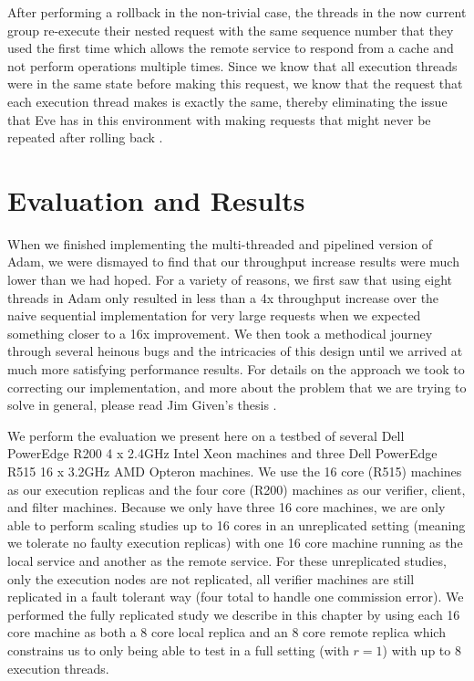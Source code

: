 \documentclass[11pt, oneside]{report}
\begin{document}
After performing a rollback in the non-trivial case, the threads in the now current group re-execute their nested request with the same sequence number that they used the first time which allows the remote service to respond from a cache and not perform operations multiple times.
Since we know that all execution threads were in the same state before making this request, we know that the request that each execution thread makes is exactly the same, thereby eliminating the issue that Eve has in this environment with making requests that might never be repeated after rolling back \cite{manosThesis}.

\chapter{Evaluation and Results}\label{AdamResults}

When we finished implementing the multi-threaded and pipelined version of Adam, we were dismayed to find that our throughput increase results were much lower than we had hoped. 
For a variety of reasons, we first saw that using eight threads in Adam only resulted in less than a 4x throughput increase over the naive sequential implementation for very large requests when we expected something closer to a 16x improvement. 
We then took a methodical journey through several heinous bugs and the intricacies of this design until we arrived at much more satisfying performance results. 
For details on the approach we took to correcting our implementation, and more about the problem that we are trying to solve in general, please read Jim Given's thesis \cite{jim}.

We perform the evaluation we present here on a testbed of several Dell PowerEdge R200 4 x 2.4GHz Intel Xeon machines and three Dell PowerEdge R515 16 x 3.2GHz AMD Opteron machines. 
We use the 16 core (R515) machines as our execution replicas and the four core (R200) machines as our verifier, client, and filter machines. 
Because we only have three 16 core machines, we are only able to perform scaling studies up to 16 cores in an unreplicated setting (meaning we tolerate no faulty execution replicas) with one 16 core machine running as the local service and another as the remote service. 
For these unreplicated studies, only the execution nodes are not replicated, all verifier machines are still replicated in a fault tolerant way (four total to handle one commission error). 
We performed the fully replicated study we describe in this chapter by using each 16 core machine as both a 8 core local replica and an 8 core remote replica which constrains us to only being able to test in a full setting (with $r = 1$) with up to 8 execution threads.
\end{document}

